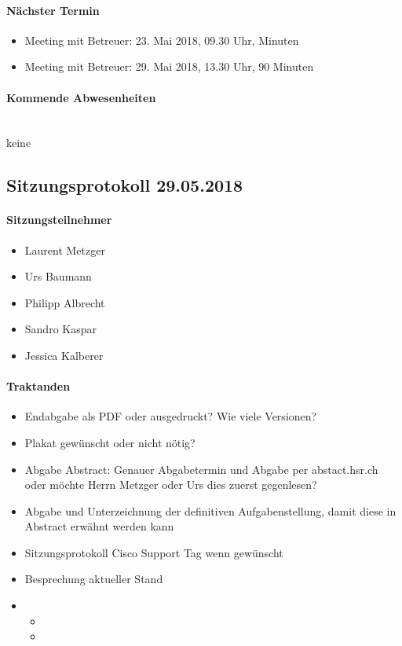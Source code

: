 \paragraph{Nächster Termin}
\begin{itemize}	
	\item Meeting mit Betreuer: 23. Mai 2018, 09.30 Uhr,  Minuten
	\item Meeting mit Betreuer: 29. Mai 2018, 13.30 Uhr, 90 Minuten
\end{itemize}

\paragraph{Kommende Abwesenheiten} \mbox{}\\
keine


\newpage


\subsection{Sitzungsprotokoll 29.05.2018}

\paragraph{Sitzungsteilnehmer}
\begin{itemize}	
	\item Laurent Metzger 
	\item Urs Baumann
	\item Philipp Albrecht
	\item Sandro Kaspar
	\item Jessica Kalberer
\end{itemize}

\paragraph{Traktanden}
\begin{itemize}	
	\item Endabgabe als PDF oder ausgedruckt? Wie viele Versionen?
	\item Plakat gewünscht oder nicht nötig?
	\item Abgabe Abstract: Genauer Abgabetermin und Abgabe per abstact.hsr.ch oder möchte Herrn Metzger oder Urs dies zuerst gegenlesen?
	\item Abgabe und Unterzeichnung der definitiven Aufgabenstellung, damit diese in Abstract erwähnt werden kann
	\item Sitzungsprotokoll Cisco Support Tag wenn gewünscht
	\item Besprechung aktueller Stand
	\item 	
	\begin{itemize}
		\item 
		\item 
	\end{itemize}
\end{itemize}

